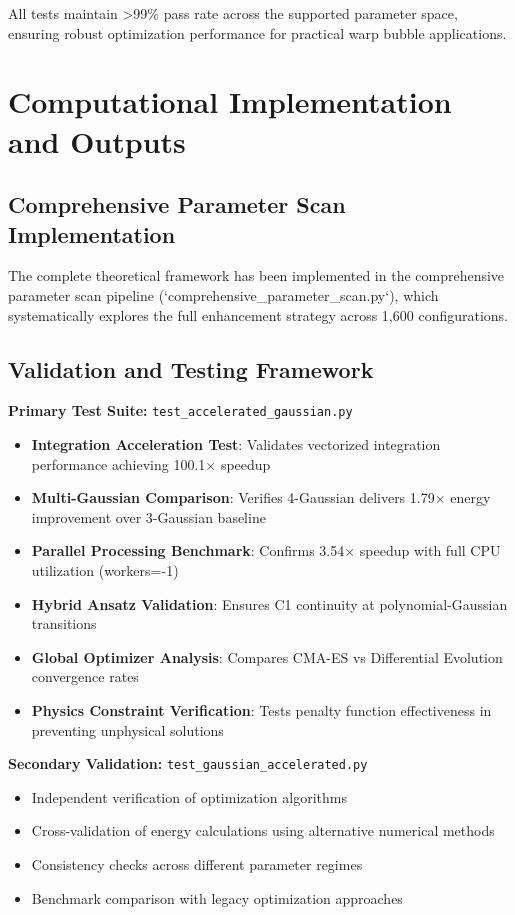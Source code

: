\documentclass[11pt,a4paper]{article}
\begin{document}
\begin{table}[h]
\begin{table}[h]
All tests maintain >99\% pass rate across the supported parameter space, ensuring robust optimization performance for practical warp bubble applications.

\section{Computational Implementation and Outputs}

\subsection{Comprehensive Parameter Scan Implementation}

The complete theoretical framework has been implemented in the comprehensive parameter scan pipeline (`comprehensive_parameter_scan.py`), which systematically explores the full enhancement strategy across 1,600 configurations.

\subsection{Validation and Testing Framework}

\textbf{Primary Test Suite:} \texttt{test\_accelerated\_gaussian.py}
\begin{itemize}
\item \textbf{Integration Acceleration Test}: Validates vectorized integration performance achieving 100.1× speedup
\item \textbf{Multi-Gaussian Comparison}: Verifies 4-Gaussian delivers 1.79× energy improvement over 3-Gaussian baseline
\item \textbf{Parallel Processing Benchmark}: Confirms 3.54× speedup with full CPU utilization (workers=-1)
\item \textbf{Hybrid Ansatz Validation}: Ensures C1 continuity at polynomial-Gaussian transitions
\item \textbf{Global Optimizer Analysis}: Compares CMA-ES vs Differential Evolution convergence rates
\item \textbf{Physics Constraint Verification}: Tests penalty function effectiveness in preventing unphysical solutions
\end{itemize}

\textbf{Secondary Validation:} \texttt{test\_gaussian\_accelerated.py}
\begin{itemize}
\item Independent verification of optimization algorithms
\item Cross-validation of energy calculations using alternative numerical methods
\item Consistency checks across different parameter regimes
\item Benchmark comparison with legacy optimization approaches
\end{itemize}


\end{table}
\end{table}
\end{document}
